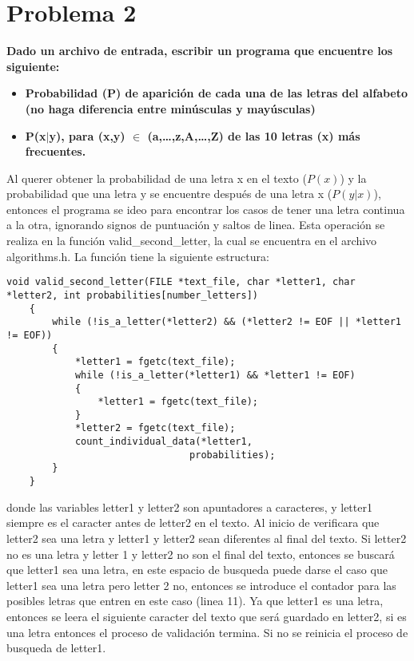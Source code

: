 \section*{Problema 2}

\textbf{Dado un archivo de entrada, escribir un programa que encuentre los siguiente:}

\begin{itemize}
    \item  \textbf{Probabilidad (P) de aparición de cada una de las letras del alfabeto (no haga diferencia entre minúsculas y mayúsculas)}
    \item \textbf{P(x$|$y), para (x,y) $\mathbb{\in}$ (a,…,z,A,…,Z) de las 10 letras (x) más frecuentes.}
\end{itemize}

Al querer obtener la probabilidad de una letra x en el texto ($P(x)$) y la probabilidad que una letra y se encuentre después de una letra x ($P(y|x)$), entonces el programa se ideo para encontrar los casos de tener una letra continua a la otra, ignorando signos de puntuación y saltos de linea.  Esta operación se realiza en la función \textcolor{title}{valid\_second\_letter}, la cual se encuentra en el archivo \textcolor{citecolor}{algorithms.h}. La función tiene la siguiente estructura:

\begin{lstlisting}[style=CStyle]
        void valid_second_letter(FILE *text_file, char *letter1, char *letter2, int probabilities[number_letters])
    {
        while (!is_a_letter(*letter2) && (*letter2 != EOF || *letter1 != EOF))
        {
            *letter1 = fgetc(text_file);
            while (!is_a_letter(*letter1) && *letter1 != EOF)
            {
                *letter1 = fgetc(text_file);
            }
            *letter2 = fgetc(text_file);
            count_individual_data(*letter1,
                                probabilities);
        }
    }
\end{lstlisting}

donde las variables letter1 y letter2 son apuntadores a caracteres, y letter1 siempre es el caracter antes de letter2 en el texto. Al inicio de verificara que letter2 sea una letra y letter1 y letter2 sean diferentes al final del texto. Si letter2 no es una letra y letter 1 y letter2 no son el final del texto, entonces se buscará que letter1 sea una letra, en este espacio de busqueda puede darse el caso que letter1 sea una letra pero letter 2 no, entonces se introduce el contador para las posibles letras que entren en este caso (linea 11). Ya que letter1 es una letra, entonces se leera el siguiente caracter del texto que será guardado en letter2, si es una letra entonces el proceso de validación termina. Si no se reinicia el proceso de busqueda de letter1.


